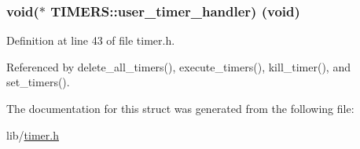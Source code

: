 \subsubsection[{\texorpdfstring{user\+\_\+timer\+\_\+handler}{user_timer_handler}}]{\setlength{\rightskip}{0pt plus 5cm}void($\ast$ T\+I\+M\+E\+R\+S\+::user\+\_\+timer\+\_\+handler) (void)}\hypertarget{structTIMERS_a4326e05ca52d80147efafd0d246ecb41}{}\label{structTIMERS_a4326e05ca52d80147efafd0d246ecb41}


Definition at line 43 of file timer.\+h.



Referenced by delete\+\_\+all\+\_\+timers(), execute\+\_\+timers(), kill\+\_\+timer(), and set\+\_\+timers().



The documentation for this struct was generated from the following file\+:\begin{DoxyCompactItemize}
\item 
lib/\hyperlink{timer_8h}{timer.\+h}\end{DoxyCompactItemize}
